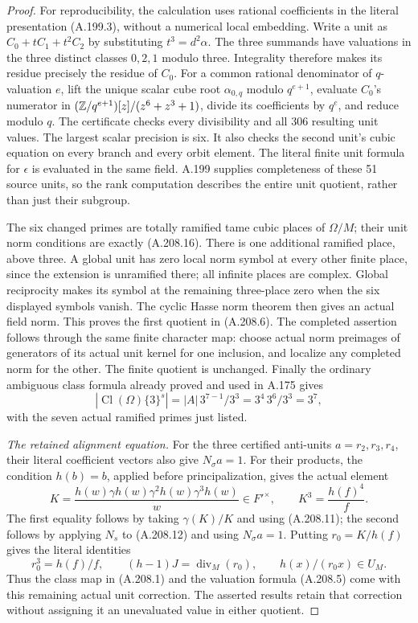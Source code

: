 \begin{proof}
For reproducibility, the calculation uses rational coefficients
in the literal presentation (A.199.3), without a numerical local
embedding.  Write a unit as \(C_0+tC_1+t^2C_2\) by substituting
\(t^3=d^2\alpha\).  The three summands have valuations in
the three distinct classes \(0,2,1\) modulo three.  Integrality
therefore makes its residue precisely the residue of \(C_0\).
For a common rational denominator of \(q\)-valuation \(e\),
lift the unique scalar cube root \(\alpha_{0,q}\) modulo
\(q^{e+1}\), evaluate \(C_0\)'s numerator in
\((\mathbb Z/q^{e+1})[z]/(z^6+z^3+1)\), divide its coefficients
by \(q^e\), and reduce modulo \(q\).  The certificate checks
every divisibility and all 306 resulting unit values.  The
largest scalar precision is six.  It also checks the second
unit's cubic equation on every branch and every orbit element.
The literal finite unit formula for \(\epsilon\) is evaluated
in the same field.  A.199 supplies completeness of these 51
source units, so the rank computation describes the entire
unit quotient, rather than just their subgroup.

The six changed primes are totally ramified tame cubic places
of \(\Omega/M\); their unit norm conditions are exactly
(A.208.16).  There is one additional ramified place, above
three.  A global unit has zero local norm symbol at every
other finite place, since the extension is unramified there;
all infinite places are complex.  Global reciprocity makes its
symbol at the remaining three-place zero when the six displayed
symbols vanish.  The cyclic Hasse norm theorem
\cite[Chapter VIII, Theorem 3.1, printed p.~234]{MilneCFT}
then gives an actual field norm.  This proves the first quotient
in (A.208.6).  The completed assertion follows through the same
finite character map: choose actual norm preimages of generators
of its actual unit kernel for one inclusion, and localize any
completed norm for the other.  The finite quotient is unchanged.
Finally the ordinary ambiguous class formula already proved and
used in A.175 gives
\[
 |\operatorname{Cl}(\Omega)\{3\}^{s}|
    =|A|\,3^{7-1}/3^3=3^4\,3^6/3^3=3^7,
\tag{A.208.20}
\]
with the seven actual ramified primes just listed.

\emph{The retained alignment equation.}
For the three certified anti-units \(a=r_2,r_3,r_4\),
their literal coefficient vectors also give \(N_\sigma a=1\).
For their products, the condition \(h(b)=b\), applied before
principalization, gives the actual element
\[
 K=\frac{h(w)\gamma h(w)\gamma^2h(w)\gamma^3h(w)}{w}
       \in F'^\times,\qquad
 K^3=\frac{h(f)^4}{f}.
\tag{A.208.21}
\]
The first equality follows by taking \(\gamma(K)/K\) and
using (A.208.11); the second follows by applying \(N_s\)
to (A.208.12) and using \(N_\sigma a=1\).
Putting \(r_0=K/h(f)\) gives the literal identities
\[
 r_0^3=h(f)/f,\qquad
 (h-1)J=\operatorname{div}_M(r_0),\qquad
                   h(x)/(r_0x)\in U_M.
\tag{A.208.22}
\]
Thus the class map in (A.208.1) and the valuation formula
(A.208.5) come with this remaining actual unit correction.
The asserted results retain that correction without assigning
it an unevaluated value in either quotient.


\end{proof}
